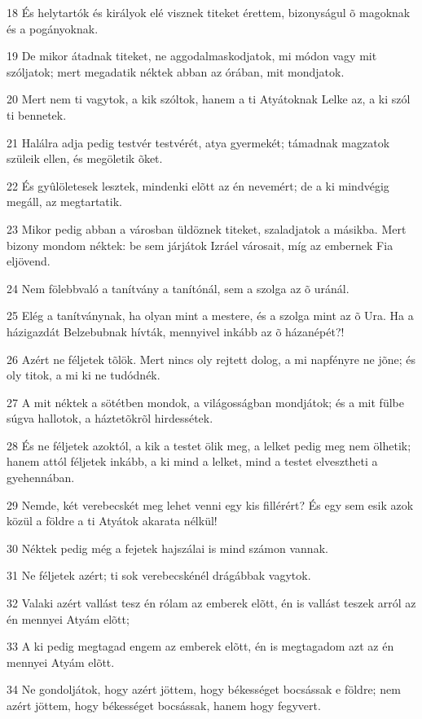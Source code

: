 \par 18 És helytartók és királyok elé visznek titeket érettem, bizonyságul õ magoknak és a pogányoknak.
\par 19 De mikor átadnak titeket, ne aggodalmaskodjatok, mi módon vagy mit szóljatok; mert megadatik néktek abban az órában, mit mondjatok.
\par 20 Mert nem ti vagytok, a kik szóltok, hanem a ti Atyátoknak Lelke az, a ki szól ti bennetek.
\par 21 Halálra adja pedig testvér testvérét, atya gyermekét; támadnak magzatok szüleik ellen, és megöletik õket.
\par 22 És gyûlöletesek lesztek, mindenki elõtt az én nevemért; de a ki mindvégig megáll, az megtartatik.
\par 23 Mikor pedig abban a városban üldöznek titeket, szaladjatok a másikba. Mert bizony mondom néktek: be sem járjátok Izráel városait, míg az embernek Fia eljövend.
\par 24 Nem fölebbvaló a tanítvány a tanítónál, sem a szolga az õ uránál.
\par 25 Elég a tanítványnak, ha olyan mint a mestere, és a szolga mint az õ Ura. Ha a házigazdát Belzebubnak hívták, mennyivel inkább az õ házanépét?!
\par 26 Azért ne féljetek tõlök. Mert nincs oly rejtett dolog, a mi napfényre ne jõne; és oly titok, a mi ki ne tudódnék.
\par 27 A mit néktek a sötétben mondok, a világosságban mondjátok; és a mit fülbe súgva hallotok, a háztetõkrõl hirdessétek.
\par 28 És ne féljetek azoktól, a kik a testet ölik meg, a lelket pedig meg nem ölhetik; hanem attól féljetek inkább, a ki mind a  lelket, mind a testet elvesztheti a gyehennában.
\par 29 Nemde, két verebecskét meg lehet venni egy kis fillérért? És egy sem esik azok közül a földre a ti Atyátok akarata nélkül!
\par 30 Néktek pedig még a fejetek hajszálai is mind számon vannak.
\par 31 Ne féljetek azért; ti sok verebecskénél drágábbak vagytok.
\par 32 Valaki azért vallást tesz én rólam az emberek elõtt, én is vallást teszek arról az én mennyei Atyám elõtt;
\par 33 A ki pedig megtagad engem az emberek elõtt, én is megtagadom azt az én mennyei Atyám elõtt.
\par 34 Ne gondoljátok, hogy azért jöttem, hogy békességet bocsássak e földre; nem azért jöttem, hogy békességet bocsássak, hanem hogy fegyvert.
